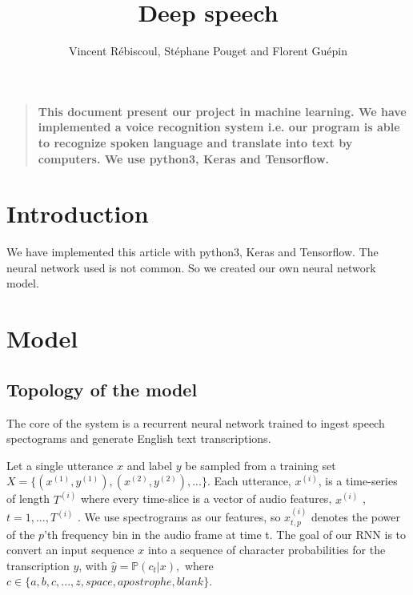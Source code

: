 \documentclass[12pt]{article}
\title{Deep speech}
\author
{Vincent R\'ebiscoul, St\'ephane Pouget and Florent Gu\'epin}
\date{}
\newenvironment{sciabstract}{%
\begin{quote} \bf}
{\end{quote}}
\begin{document}
 


\baselineskip24pt


\maketitle 




\begin{sciabstract}
  This document present our project in machine learning. We have implemented a voice recognition system i.e. our program is able to recognize spoken language and translate into text by computers.
 We use python3, Keras and Tensorflow.
\end{sciabstract}



\section*{Introduction}

We have implemented this article \cite{article} with python3, Keras and Tensorflow. The neural network used is not common. So we created our own neural network model.

\section{Model}

\subsection{Topology of the model}

The core of the system is a recurrent neural network trained to ingest speech spectograms and generate English text transcriptions.

Let a single utterance $x$ and label $y$ be sampled from a
training set $X = \{(x^{(1)}, y^{(1)}), (x^{(2)}, y^{(2)}), . . .\}. $ Each utterance, $x^{(i)}$, is a time-series of length $T^{(i)}$
where every time-slice is a vector of audio features, $x^{(i)}$ ,$ t = 1, . . . , T^{(i)}$ . We use spectrograms as our features, so $x^{(i)}_{t,p}$ denotes the power of the $p$’th frequency bin in the audio frame at time t. The goal of our RNN is to convert an input sequence $x$ into a sequence of character probabilities for the transcription $y$, with $ \hat{y}= \mathbb{P}(c_t |x),$ where $c \in \{a,b,c, . . . , z, space, apostrophe, blank\}.$
\end{document}
